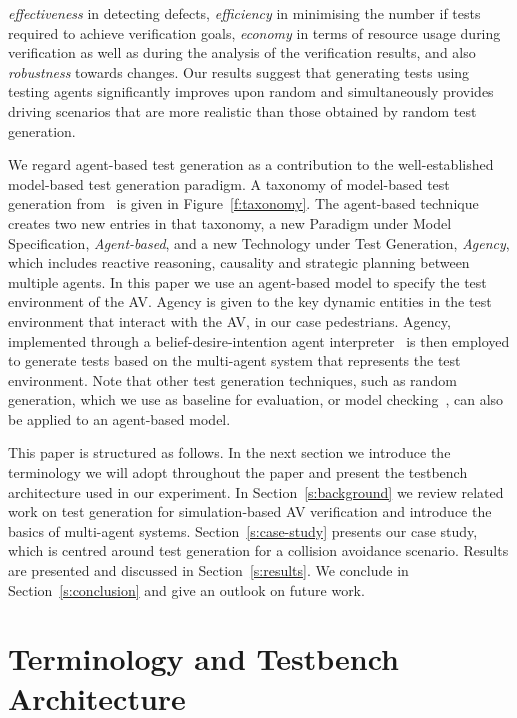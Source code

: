 \documentclass[letterpaper, 10 pt, journal, twoside]{IEEEtran}
\begin{document}
%
%
\textit{effectiveness} in detecting defects, \textit{efficiency} in minimising the number if tests required to achieve verification goals, \textit{economy} in terms of resource usage during verification as well as during the analysis of the verification results, and also \textit{robustness} towards changes. 
%
Our results suggest that generating tests using testing agents significantly improves upon random and simultaneously provides  driving scenarios that are more realistic than those obtained by random test generation.

We regard agent-based test generation as a contribution to the well-established model-based test generation paradigm. A taxonomy of model-based test generation from~\cite{utting2012taxonomy} is given in Figure~\ref{f:taxonomy}.
%
The agent-based technique creates two new entries in that taxonomy, a new Paradigm under Model Specification, \textit{Agent-based}, and a new Technology under Test Generation, \textit{Agency}, which includes reactive reasoning, causality and strategic planning between multiple agents.
%
In this paper we use an agent-based model to specify the test environment of the AV. Agency is given to the key dynamic entities in the test environment that interact with the AV, in our case pedestrians. Agency, implemented through a belief-desire-intention agent interpreter~\cite{bordini2005jason} is then employed to generate tests based on the multi-agent system that represents the test environment. Note that other test generation techniques, such as random generation, which we use as baseline for evaluation, or model checking~\cite{Bordini2006}, can also be applied to an agent-based model.	

This paper is structured as follows. In the next section we introduce the terminology we will adopt throughout the paper and present the testbench architecture used in our experiment. In Section~\ref{s:background} we review related work on test generation for simulation-based AV verification and introduce the basics of multi-agent systems. Section~\ref{s:case-study} presents our case study, which is centred around test generation for a collision avoidance scenario. Results are presented and discussed in Section~\ref{s:results}. We conclude in Section~\ref{s:conclusion} and give an outlook on future work. 

\section{Terminology and Testbench Architecture}\label{s:testbench}
\end{document}
